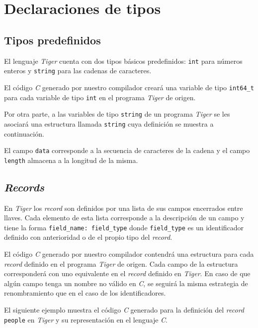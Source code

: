 \documentclass{article}
\begin{document}
\section{Declaraciones de tipos}

\subsection{Tipos predefinidos}

El lenguaje \textit{Tiger} cuenta con dos tipos básicos predefinidos:
\texttt{int} para números enteros y \texttt{string} para las cadenas de
caracteres.

El código \textit{C} generado por nuestro compilador creará una variable de
tipo \texttt{int64\_t} para cada variable de tipo \texttt{int} en el programa
\textit{Tiger} de origen.

Por otra parte, a las variables de tipo \texttt{string} de un programa
\textit{Tiger} se les asociará una estructura llamada \texttt{string} cuya
definición se muestra a continuación.

\begin{quote}

\end{quote}

El campo \texttt{data} corresponde a la secuencia de caracteres de la cadena y
el campo \texttt{length} almacena a la longitud de la misma.

\subsection{\emph{Records}}

En \textit{Tiger} los \textit{record} son definidos por una lista de sus campos
encerrados entre llaves. Cada elemento de esta lista corresponde a la
descripción de un campo y tiene la forma \verb|field_name: field_type| donde
\texttt{field\_type} es un identificador definido con anterioridad o de el
propio tipo del \emph{record}.

El código \textit{C} generado por nuestro compilador contendrá una estructura
para cada \textit{record} definido en el programa \textit{Tiger} de origen. 
Cada campo de la estructura corresponderá con uno equivalente en el
\textit{record} definido en \emph{Tiger}. En caso de que algún campo tenga un
nombre no válido en \emph{C}, se seguirá la misma estrategia de renombramiento
que en el caso de los identificadores.

El siguiente ejemplo muestra el código \textit{C} generado para la definición
del \textit{record} \texttt{people} en \emph{Tiger} y su representación en el
lenguaje \emph{C}.
\end{document}
